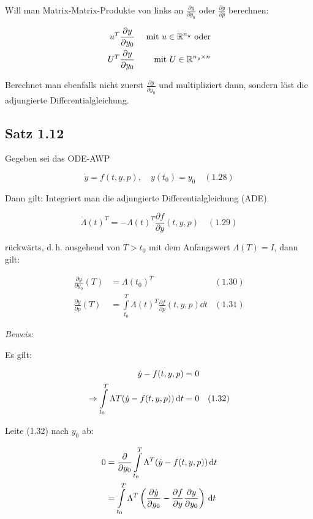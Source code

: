 
Will man Matrix-Matrix-Produkte von links an $\tfrac{\partial y}{\partial y_0}$ oder $\tfrac{\partial y}{\partial p}$ berechnen:

\begin{align*}
u^T \frac{\partial y}{\partial y_0} & & \text{ mit } u\in\mathbb{R}^{n_y} \text{ oder} \\
U^T \frac{\partial y}{\partial y_0} & & \text{ mit } U \in \mathbb{R}^{n_y \times n}
\end{align*}

Berechnet man ebenfalls nicht zuerst $\frac{\partial y}{\partial y_0}$ und multipliziert dann, sondern löst die adjungierte Differentialgleichung.

\subsection*{Satz 1.12}

Gegeben sei das ODE-AWP

\[ \dot y = f(t,y,p), \quad y(t_0) = y_0 \quad (1.28) \]

Dann gilt: Integriert man die adjungierte Differentialgleichung (ADE)

\[ \dot \Lambda (t)^T = -\Lambda(t)^T \frac{\partial f}{\partial y} (t,y,p) \quad (1.29) \]

rückwärts, d.\,h. ausgehend von $T > t_0$ mit dem Anfangswert $\Lambda(T) = I$, dann gilt:

\begin{align*}
\frac{\partial y}{\partial y_0} (T) &= \Lambda (t_0)^T & (1.30) \\
\frac{\partial y}{\partial p} (T) &= \int\limits_{t_0}^T \Lambda(t)^T \frac{\partial f}{\partial p} (t,y,p) \dd t & (1.31)
\end{align*}

\emph{Beweis:}

Es gilt:

\begin{align*}
\dot y - f(t,y,p) &= 0 \\
\Rightarrow \int\limits_{t_0}^T \Lambda T (\dot y - f(t,y,p)) \,\mathrm d t &= 0 & (1.32)
\end{align*}

Leite (1.32) nach $y_0$ ab:

\begin{align*}
0 &= \frac{\partial}{\partial y_0} \int\limits_{t_0}^T \Lambda^T (\dot y -f(t,y,p)) \,\mathrm d t \\
&= \int\limits_{t_0}^T \Lambda^T \left( \frac{\partial \dot y}{\partial y_0} - \frac{\partial f}{\partial y} \frac{\partial y}{\partial y_0} \right) \,\mathrm d t
\end{align*}

